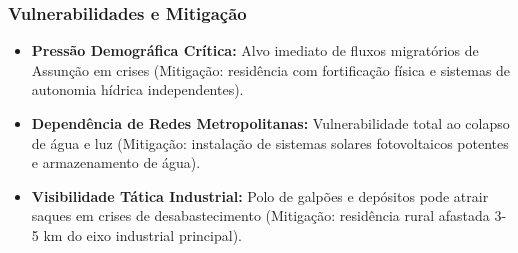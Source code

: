 \subsubsection{Vulnerabilidades e
Mitigação}

\begin{itemize}
\tightlist
\item
  \textbf{Pressão Demográfica Crítica:} Alvo imediato de fluxos
  migratórios de Assunção em crises (Mitigação: residência com
  fortificação física e sistemas de autonomia hídrica independentes).
\item
  \textbf{Dependência de Redes Metropolitanas:} Vulnerabilidade total ao
  colapso de água e luz (Mitigação: instalação de sistemas solares
  fotovoltaicos potentes e armazenamento de água).
\item
  \textbf{Visibilidade Tática Industrial:} Polo de galpões e depósitos
  pode atrair saques em crises de desabastecimento (Mitigação:
  residência rural afastada 3-5 km do eixo industrial principal).
\end{itemize}

